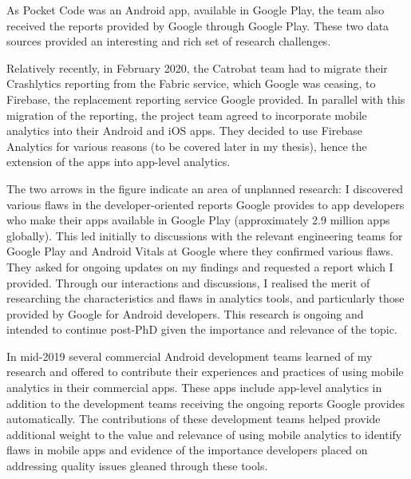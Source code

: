 As Pocket Code was an Android app, available in Google Play, the team also received the reports provided by Google through Google Play. These two data sources provided an interesting and rich set of research challenges. 

Relatively recently, in February 2020, the Catrobat team had to migrate their Crashlytics reporting from the Fabric service, which Google was ceasing, to Firebase, the replacement reporting service Google provided. In parallel with this migration of the reporting, the project team agreed to incorporate mobile analytics into their Android and iOS apps. They decided to use Firebase Analytics for various reasons (to be covered later in my thesis), hence the extension of the apps into app-level analytics.

The two arrows in the figure indicate an area of unplanned research: 
%
I discovered various flaws in the developer-oriented reports Google provides to app developers who make their apps available in Google Play (approximately 2.9 million apps globally). This led initially to discussions with the relevant engineering teams for Google Play and Android Vitals at Google where they confirmed various flaws. They asked for ongoing updates on my findings and requested a report which I provided. Through our interactions and discussions, I realised the merit of researching the characteristics and flaws in analytics tools, and particularly those provided by Google for Android developers. This research is ongoing and intended to continue post-PhD given the importance and relevance of the topic.

In mid-2019 several commercial Android development teams learned of my research and offered to contribute their experiences and practices of using mobile analytics in their commercial apps. These apps include app-level analytics in addition to the development teams receiving the ongoing reports Google provides automatically. The contributions of these development teams helped provide additional weight to the value and relevance of using mobile analytics to identify flaws in mobile apps and evidence of the importance developers placed on addressing quality issues gleaned through these tools.


